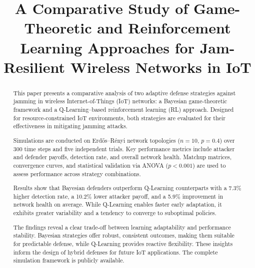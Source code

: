 \documentclass[conference]{IEEEtran}
\begin{document}
\title{A Comparative Study of Game-Theoretic and Reinforcement Learning Approaches for Jam-Resilient Wireless Networks in IoT}

\author{
  \and
  \and
}

\maketitle

\begin{abstract}
This paper presents a comparative analysis of two adaptive defense strategies against jamming in wireless Internet-of-Things (IoT) networks: a Bayesian game-theoretic framework and a Q-Learning–based reinforcement learning (RL) approach. Designed for resource-constrained IoT environments, both strategies are evaluated for their effectiveness in mitigating jamming attacks.

Simulations are conducted on Erd\H{o}s–R\'enyi network topologies ($n = 10$, $p = 0.4$) over 300 time steps and five independent trials. Key performance metrics include attacker and defender payoffs, detection rate, and overall network health. Matchup matrices, convergence curves, and statistical validation via ANOVA ($p < 0.001$) are used to assess performance across strategy combinations.

Results show that Bayesian defenders outperform Q-Learning counterparts with a 7.3\% higher detection rate, a 10.2\% lower attacker payoff, and a 5.9\% improvement in network health on average. While Q-Learning enables faster early adaptation, it exhibits greater variability and a tendency to converge to suboptimal policies.

The findings reveal a clear trade-off between learning adaptability and performance stability. Bayesian strategies offer robust, consistent outcomes, making them suitable for predictable defense, while Q-Learning provides reactive flexibility. These insights inform the design of hybrid defenses for future IoT applications. The complete simulation framework is publicly available.
\end{abstract}
\end{document}
